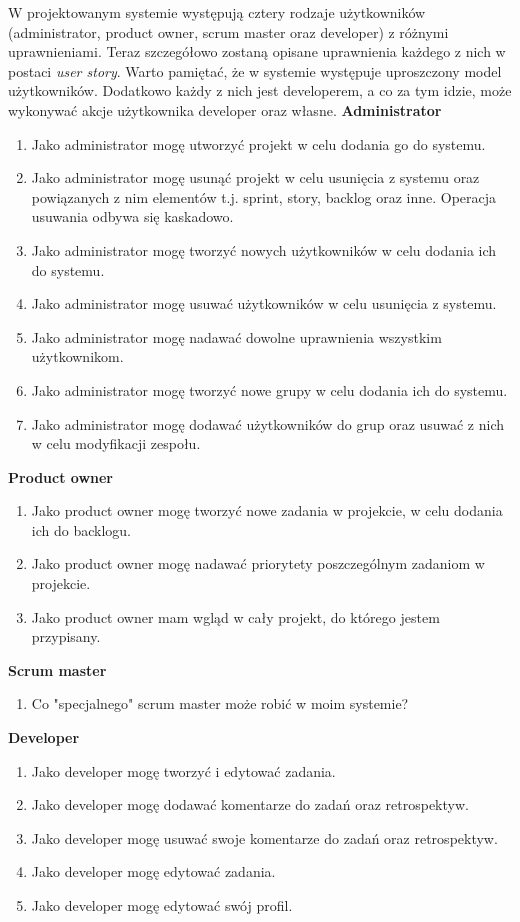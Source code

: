 \documentclass[a4paper,11pt]{article}
\begin{document}
W projektowanym systemie występują cztery rodzaje użytkowników (administrator, product owner, scrum master oraz developer) z różnymi uprawnieniami. Teraz szczegółowo zostaną opisane uprawnienia każdego z nich w postaci \textit{user story}. Warto pamiętać, że w systemie występuje uproszczony model użytkowników. Dodatkowo każdy z nich jest developerem, a co za tym idzie, może wykonywać akcje użytkownika developer oraz własne.
	\newline
	\newline
	\textbf{Administrator}
	\begin{enumerate}		
		\item Jako administrator mogę utworzyć projekt w celu dodania go do systemu.
		\item Jako administrator mogę usunąć projekt w celu usunięcia z systemu oraz powiązanych z nim elementów t.j. sprint, story, backlog oraz inne. Operacja usuwania odbywa się kaskadowo.
		\item Jako administrator mogę tworzyć nowych użytkowników w celu dodania ich do systemu.
		\item Jako administrator mogę usuwać użytkowników w celu usunięcia z systemu.
		\item Jako administrator mogę nadawać dowolne uprawnienia wszystkim użytkownikom.
		\item Jako administrator mogę tworzyć nowe grupy w celu dodania ich do systemu.
		\item Jako administrator mogę dodawać użytkowników do grup oraz usuwać z nich w celu modyfikacji zespołu.		 
	\end{enumerate}		
	\textbf{Product owner}
	\begin{enumerate}		
		\item Jako product owner mogę tworzyć nowe zadania w projekcie, w celu dodania ich do backlogu.
		\item Jako product owner mogę nadawać priorytety poszczególnym zadaniom w projekcie.
		\item Jako product owner mam wgląd w cały projekt, do którego jestem przypisany.
	\end{enumerate}	
	\textbf{Scrum master}
	\begin{enumerate}		
		\item Co "specjalnego" scrum master może robić w moim systemie?
	\end{enumerate}
	\textbf{Developer}
	\begin{enumerate}		
		\item Jako developer mogę tworzyć i edytować zadania.
		\item Jako developer mogę dodawać komentarze do zadań oraz retrospektyw.
		\item Jako developer mogę usuwać swoje komentarze do zadań oraz retrospektyw.
		\item Jako developer mogę edytować zadania.
		\item Jako developer mogę edytować swój profil.
	\end{enumerate}
	
\end{document}
